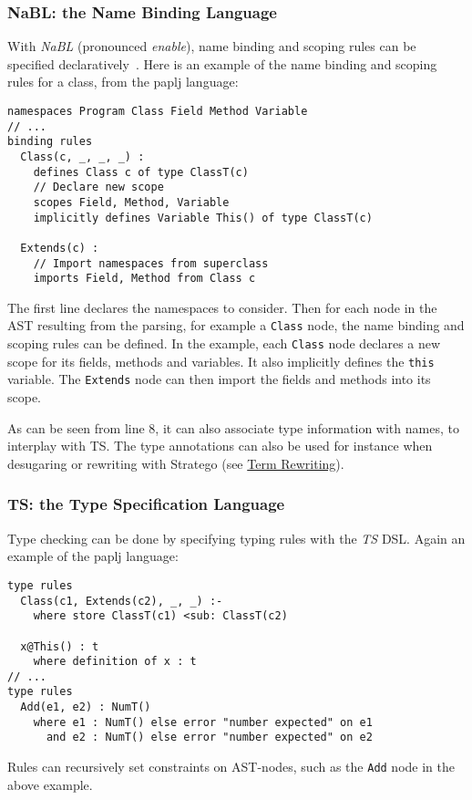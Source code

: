 \subsubsection{NaBL: the Name Binding Language}
\label{sec:orgheadline3}
With \emph{NaBL} (pronounced \emph{enable}), name binding and scoping rules can
be specified declaratively~\cite{KonatKWV12}. Here is an example
of the name binding and scoping rules for a class, from the paplj
language:
\begin{verbatim}
namespaces Program Class Field Method Variable
// ...
binding rules
  Class(c, _, _, _) :
    defines Class c of type ClassT(c)
    // Declare new scope
    scopes Field, Method, Variable
    implicitly defines Variable This() of type ClassT(c)

  Extends(c) :
    // Import namespaces from superclass
    imports Field, Method from Class c
\end{verbatim}
The first line declares the namespaces to consider. Then for each node
in the AST resulting from the parsing, for example a \texttt{Class} node, the
name binding and scoping rules can be defined. In the example, each
\texttt{Class} node declares a new scope for its fields, methods and
variables. It also implicitly defines the \texttt{this} variable. The
\texttt{Extends} node can then import the fields and methods into its scope.

As can be seen from line 8, it can also associate type information
with names, to interplay with TS. The type annotations can also be
used for instance when desugaring or rewriting with Stratego (see \hyperref[sec-term-rewrite]{Term
Rewriting}).
\subsubsection{TS: the Type Specification Language}
\label{sec:orgheadline4}
Type checking can be done by specifying typing rules with the \emph{TS}
DSL. Again an example of the paplj language:
\begin{verbatim}
type rules
  Class(c1, Extends(c2), _, _) :-
    where store ClassT(c1) <sub: ClassT(c2)

  x@This() : t
    where definition of x : t
// ...
type rules
  Add(e1, e2) : NumT()
    where e1 : NumT() else error "number expected" on e1
      and e2 : NumT() else error "number expected" on e2
\end{verbatim}
Rules can recursively set constraints on AST-nodes, such as the \texttt{Add}
node in the above example.

